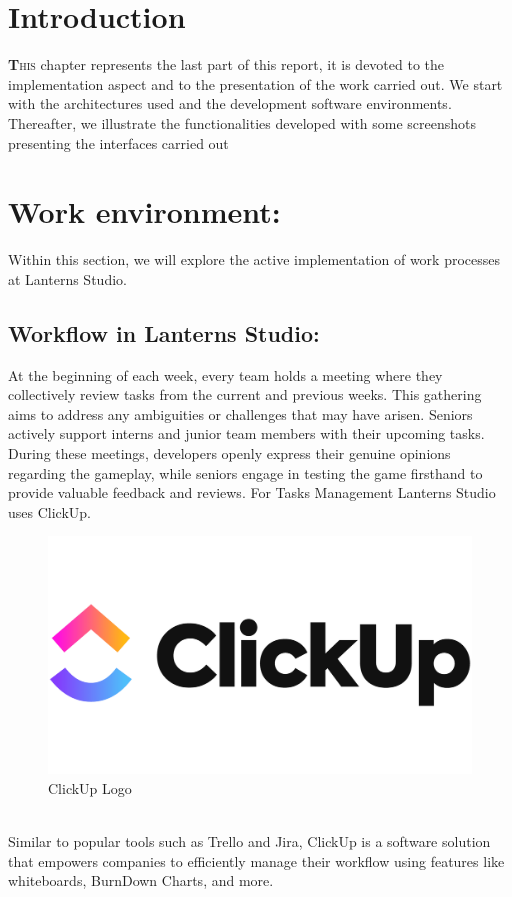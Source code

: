 \documentclass[12pt]{book}
\begin{document}
\section{Introduction}
\lettrine[findent=1pt]{\textbf{T}}{his} chapter represents the last part of this report, it is devoted to the implementation aspect and to the presentation of the work carried out. We start with the architectures used and the development software environments. Thereafter, we illustrate the functionalities developed with some screenshots presenting the interfaces carried out
\section{Work environment:}
Within this section, we will explore the active implementation of work processes at Lanterns Studio.
\subsection{Workflow in Lanterns Studio:}
At the beginning of each week, every team holds a meeting where they collectively review tasks from the current and previous weeks.
This gathering aims to address any ambiguities or challenges that may have arisen. Seniors actively support interns and junior team members
with their upcoming tasks. During these meetings, developers openly express their genuine opinions regarding the gameplay, while seniors engage in testing the game firsthand to provide valuable feedback and reviews.
For Tasks Management Lanterns Studio uses ClickUp.
\begin{figure}[!h]
    \centering
    \includegraphics[scale=0.03]{./Figures/Images/ClickUp-Logo.png}
    \caption{ClickUp Logo}
    \label{ClickUp Logo}
\end{figure}\\
Similar to popular tools such as Trello and Jira, ClickUp is a software solution that empowers companies to efficiently manage their workflow using features like whiteboards, BurnDown Charts, and more.
\end{document}
